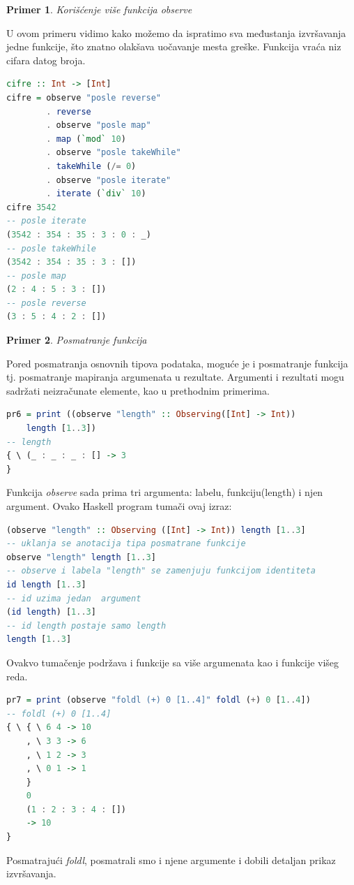 \documentclass[a4paper]{article}
\newtheorem{primer}{Primer}[section]
\begin{document}
{\begin{primer} 
Korišćenje više funkcija observe
\end{primer}
U ovom primeru vidimo kako možemo da ispratimo sva međustanja izvršavanja jedne funkcije, što znatno olakšava uočavanje mesta greške.
Funkcija vraća niz cifara datog broja.
\begin{lstlisting}[language=Haskell]
cifre :: Int -> [Int]
cifre = observe "posle reverse" 
		. reverse
		. observe "posle map"
		. map (`mod` 10)
		. observe "posle takeWhile"
		. takeWhile (/= 0)
		. observe "posle iterate"
		. iterate (`div` 10)
cifre 3542
-- posle iterate
(3542 : 354 : 35 : 3 : 0 : _)
-- posle takeWhile
(3542 : 354 : 35 : 3 : [])
-- posle map
(2 : 4 : 5 : 3 : [])
-- posle reverse
(3 : 5 : 4 : 2 : [])
\end{lstlisting}


\begin{primer}
Posmatranje funkcija
\end{primer}
Pored posmatranja osnovnih tipova podataka, moguće je i posmatranje funkcija tj. posmatranje mapiranja argumenata u rezultate.
Argumenti i rezultati mogu sadržati neizračunate elemente, kao u prethodnim primerima.
\begin{lstlisting}[language=Haskell]
pr6 = print ((observe "length" :: Observing([Int] -> Int)) 
	length [1..3])
-- length
{ \ (_ : _ : _ : [] -> 3
}
\end{lstlisting}
Funkcija {\em observe} sada prima tri argumenta: labelu, funkciju(length) i njen argument. 
Ovako Haskell program tumači ovaj izraz:
\begin{lstlisting}[language=Haskell]
(observe "length" :: Observing ([Int] -> Int)) length [1..3]
-- uklanja se anotacija tipa posmatrane funkcije
observe "length" length [1..3]
-- observe i labela "length" se zamenjuju funkcijom identiteta
id length [1..3]
-- id uzima jedan  argument
(id length) [1..3]
-- id length postaje samo length
length [1..3]
\end{lstlisting}

Ovakvo tumačenje podržava i funkcije sa više argumenata kao i funkcije višeg reda.

\begin{lstlisting}[language=Haskell]
pr7 = print (observe "foldl (+) 0 [1..4]" foldl (+) 0 [1..4])
-- foldl (+) 0 [1..4]
{ \ { \ 6 4 -> 10
    , \ 3 3 -> 6
    , \ 1 2 -> 3
    , \ 0 1 -> 1
    }
    0
    (1 : 2 : 3 : 4 : [])
    -> 10
} 
\end{lstlisting}
Posmatrajući {\em foldl}, posmatrali smo i njene argumente i dobili detaljan prikaz izvršavanja.

}
\end{document}
